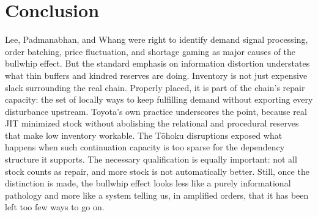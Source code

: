 \documentclass[11pt]{article}
\begin{document}
\section{Conclusion}
Lee, Padmanabhan, and Whang were right to identify demand signal processing, order batching, price fluctuation, and shortage gaming as major causes of the bullwhip effect. But the standard emphasis on information distortion understates what thin buffers and kindred reserves are doing. Inventory is not just expensive slack surrounding the real chain. Properly placed, it is part of the chain's repair capacity: the set of locally \admissible ways to keep fulfilling demand without exporting every disturbance upstream. Toyota's own practice underscores the point, because real JIT minimized stock without abolishing the relational and procedural reserves that make low inventory workable. The T\=ohoku disruptions exposed what happens when such continuation capacity is too sparse for the dependency structure it supports. The necessary qualification is equally important: not all stock counts as repair, and more stock is not automatically better. Still, once the distinction is made, the bullwhip effect looks less like a purely informational pathology and more like a system telling us, in amplified orders, that it has been left too few ways to go on.
\end{document}
